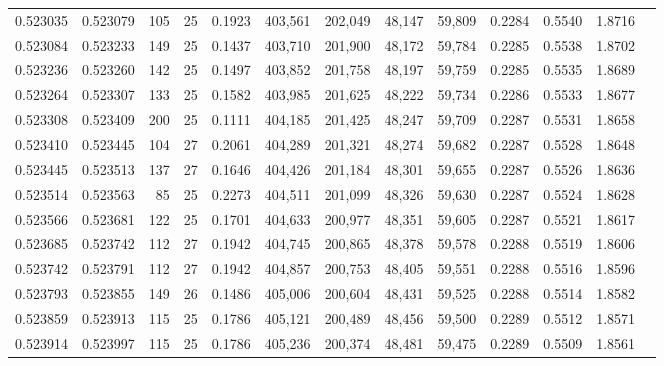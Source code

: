 \begin{tabular}{rrrrrrrrrrrrr}
0.523035 & 0.523079 & 105 &  25 &                                     0.1923 & 403,561 & 202,049 &  48,147 &  59,809 & 0.2284 & 0.5540 & 1.8716 \\
0.523084 & 0.523233 & 149 &  25 &                                     0.1437 & 403,710 & 201,900 &  48,172 &  59,784 & 0.2285 & 0.5538 & 1.8702 \\
0.523236 & 0.523260 & 142 &  25 &                                     0.1497 & 403,852 & 201,758 &  48,197 &  59,759 & 0.2285 & 0.5535 & 1.8689 \\
0.523264 & 0.523307 & 133 &  25 &                                     0.1582 & 403,985 & 201,625 &  48,222 &  59,734 & 0.2286 & 0.5533 & 1.8677 \\
0.523308 & 0.523409 & 200 &  25 &                                     0.1111 & 404,185 & 201,425 &  48,247 &  59,709 & 0.2287 & 0.5531 & 1.8658 \\
0.523410 & 0.523445 & 104 &  27 &                                     0.2061 & 404,289 & 201,321 &  48,274 &  59,682 & 0.2287 & 0.5528 & 1.8648 \\
0.523445 & 0.523513 & 137 &  27 &                                     0.1646 & 404,426 & 201,184 &  48,301 &  59,655 & 0.2287 & 0.5526 & 1.8636 \\
0.523514 & 0.523563 &  85 &  25 &                                     0.2273 & 404,511 & 201,099 &  48,326 &  59,630 & 0.2287 & 0.5524 & 1.8628 \\
0.523566 & 0.523681 & 122 &  25 &                                     0.1701 & 404,633 & 200,977 &  48,351 &  59,605 & 0.2287 & 0.5521 & 1.8617 \\
0.523685 & 0.523742 & 112 &  27 &                                     0.1942 & 404,745 & 200,865 &  48,378 &  59,578 & 0.2288 & 0.5519 & 1.8606 \\
0.523742 & 0.523791 & 112 &  27 &                                     0.1942 & 404,857 & 200,753 &  48,405 &  59,551 & 0.2288 & 0.5516 & 1.8596 \\
0.523793 & 0.523855 & 149 &  26 &                                     0.1486 & 405,006 & 200,604 &  48,431 &  59,525 & 0.2288 & 0.5514 & 1.8582 \\
0.523859 & 0.523913 & 115 &  25 &                                     0.1786 & 405,121 & 200,489 &  48,456 &  59,500 & 0.2289 & 0.5512 & 1.8571 \\
0.523914 & 0.523997 & 115 &  25 &                                     0.1786 & 405,236 & 200,374 &  48,481 &  59,475 & 0.2289 & 0.5509 & 1.8561 \\

\end{tabular}
